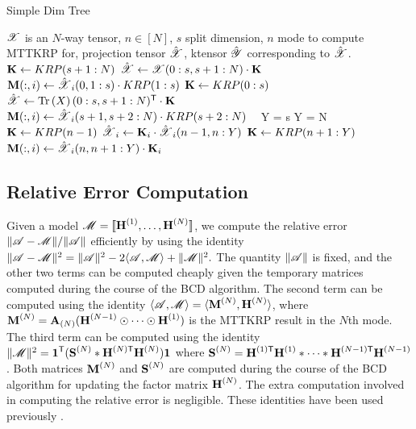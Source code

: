 \begin{algorithm}
\caption{Simple Dim Tree}
\label{alg:simpleDT}
\begin{algorithmic}
\Require $\T{X}$ is an $N$-way tensor, $n \in [N]$, $s$ split dimension, $n$ mode to compute MTTKRP for, projection tensor $\hat{\T{X}}$, ktensor $\hat{\T{Y}}$ corresponding to $\hat{\T{X}}$.
		\State $\M{K} \leftarrow KRP(s+1:N)$
		\State $\hat{\T{X}} \leftarrow \T{X}(0:s,s+1:N) \cdot \M{K}$
			\State $\M{M}(:,i) \leftarrow \hat{\T{X}}_i(0,1:s) \cdot KRP(1:s)$
		\EndFor
	\Else %
		\State $\M{K} \leftarrow KRP(0:s)$
		\State $\hat{\T{X}} \leftarrow \Tr{X}(0:s,s+1:N)^\Tra \cdot \M{K}$
			\State $\M{M}(:,i) \leftarrow \hat{\T{X}}_i(s+1,s+2:N) \cdot KRP(s+2:N)$
		\EndFor
	\EndIf
\
\Else
		\State Y = s
	\Else
		\State Y = N
	\EndIf
		\State  $\M{K} \leftarrow KRP(n-1)$
		\State $\hat{\T{X}}_i \leftarrow \M{K}_i \cdot \hat{\T{X}}_i(n-1,n:Y)$ %
	\EndFor
		\State  $\M{K} \leftarrow KRP(n+1:Y)$
		\State $\M{M}(:,i) \leftarrow \hat{\T{X}}_i(n,n+1:Y) \cdot \M{K}_i$
	\EndFor
\EndIf
\end{algorithmic}
\end{algorithm}

\subsection{Relative Error Computation}
\label{sec:error}

Given a model $\T{M}=\CP$, we compute the relative error $\|\TA - \T{M}\|/\|\TA\|$ efficiently by using the identity $\|\TA-\T{M}\|^2 = \|\TA\|^2 - 2\langle \TA, \T{M} \rangle + \|\T{M}\|^2.$
The quantity $\|\TA\|$ is fixed, and the other two terms can be computed cheaply given the temporary matrices computed during the course of the BCD algorithm.
The second term can be computed using the identity $\langle \TA, \T{M} \rangle = \langle \Mn{M}{N}, \Mn{H}{N} \rangle$, where $\Mn{M}{N} = \Mz{A}{N} (\Mn{H}{N-1} \Khat \cdots \Khat \Mn{H}{1})$ is the MTTKRP result in the $N$th mode.
The third term can be computed using the identity $\|\T{M}\|^2 = \V{1}^\Tra(\Mn{S}{N} \Hada \MnTra{H}{N} \Mn{H}{N})\V{1}$ where $\Mn{S}{N}=\MnTra{H}{1} \Mn{H}{1} \Hada \cdots \Hada \MnTra{H}{N-1} \Mn{H}{N-1}$.
Both matrices $\Mn{M}{N}$ and $\Mn{S}{N}$ are computed during the course of the BCD algorithm for updating the factor matrix $\Mn{H}{N}$.
The extra computation involved in computing the relative error is negligible.
These identities have been used previously \cite{KB2009,TensorBox,SK16,LKLHS2017}.

